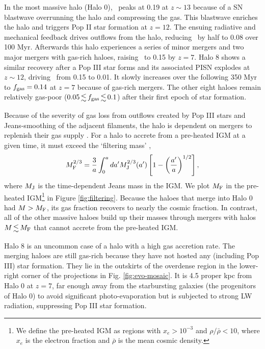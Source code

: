 \documentclass[useAMS,usenatbib]{mn2e}
\begin{document}
In the most massive halo (Halo 0), \fgas~peaks at 0.19 at $z \sim 13$
because of a SN blastwave overrunning the halo and compressing the
gas.  This blastwave enriches the halo and triggers Pop II star
formation at $z=12$.  The ensuing radiative and mechanical feedback
drives outflows from the halo, reducing \fgas~by half to 0.08 over 100
Myr.  Afterwards this halo experiences a series of minor mergers and
two major mergers with gas-rich haloes, raising \fgas~to 0.15 by
$z=7$.  Halo 8 shows a similar recovery after a Pop III star forms and
its associated PISN explodes at $z \sim 12$, driving \fgas~from 0.15
to 0.01.  It slowly increases over the following 350 Myr to $\fgas =
0.14$ at $z=7$ because of gas-rich mergers.  The other eight haloes
remain relatively gas-poor ($0.05 \la \fgas \la 0.1$) after their
first epoch of star formation.

Because of the severity of gas loss from outflows created by Pop III
stars and Jeans-smoothing of the adjacent filaments, the halo is
dependent on mergers to replenish their gas supply
\citep[cf.][]{Yoshida07, Wise08_Gal, Greif10}.  For a halo to accrete
from a pre-heated IGM at a given time, it must exceed the `filtering
mass' \citep{Hui98, Gnedin00},
%
\begin{equation}
  \label{eqn:filtering}
  M_{\rm F}^{2/3} = \frac{3}{a} \int^a_0 da^\prime M_{\rm J}^{2/3}(a^\prime)
  \left[ 1 - \left(\frac{a^\prime}{a}\right)^{1/2} \right],
\end{equation}
where $M_{\rm J}$ is the time-dependent Jeans mass in the IGM.  We
plot $M_{\rm F}$ in the pre-heated IGM\footnote{We define the
  pre-heated IGM as regions with $x_e > 10^{-3}$ and $\rho/\bar{\rho}
  < 10$, where $x_e$ is the electron fraction and $\bar{\rho}$ is the
  mean cosmic density.} in Figure \ref{fig:filtering}.  Because the
haloes that merge into Halo 0 had $M > M_{\rm F}$, its gas fraction
recovers to nearly the cosmic fraction.  In contrast, all of the other
massive haloes build up their masses through mergers with halos $M \la
M_{\rm F}$ that cannot accrete from the pre-heated IGM.

Halo 8 is an uncommon case of a halo with a high gas accretion rate.
The merging haloes are still gas-rich because they have not hosted any
(including Pop III) star formation.  They lie in the outskirts of the
overdense region in the lower-right corner of the projections in
Fig. \ref{fig:evo-mosaic}.  It is 4.5 proper kpc from Halo 0 at $z=7$,
far enough away from the starbursting galaxies (the progenitors of
Halo 0) to avoid significant photo-evaporation but is subjected to
strong LW radiation, suppressing Pop III star formation.
\end{document}
